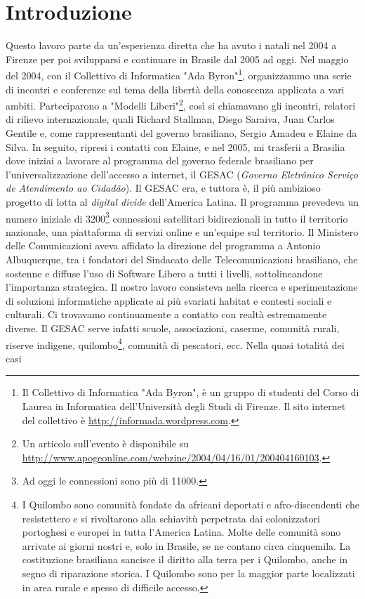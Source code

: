 
\chapter{Introduzione}
\label{Capitolo1}

Questo lavoro parte da un'esperienza diretta che ha avuto i natali nel
2004 a Firenze per poi svilupparsi e continuare in Brasile dal 2005 ad
oggi. Nel maggio del 2004, con il Collettivo di Informatica "Ada
Byron"\footnote{Il Collettivo di Informatica "Ada Byron", è un gruppo
  di studenti del Corso di Laurea in Informatica dell’Università degli
  Studi di Firenze. Il sito internet del collettivo è
  \url{http://informada.wordpress.com}.}, organizzammo una serie di
incontri e conferenze sul tema della libertà della conoscenza
applicata a vari ambiti. Parteciparono a "Modelli Liberi"\footnote{Un
  articolo sull'evento è disponibile su
  \url{http://www.apogeonline.com/webzine/2004/04/16/01/200404160103}.},
così si chiamavano gli incontri, relatori di rilievo internazionale,
quali Richard Stallman, Diego Saraiva, Juan Carlos Gentile e, come
rappresentanti del governo brasiliano, Sergio Amadeu e Elaine da
Silva. In seguito, ripresi i contatti con Elaine, e nel 2005, mi
trasferii a Brasilia dove iniziai a lavorare al programma del governo
federale brasiliano per l'universalizzazione dell'accesso a internet,
il GESAC (\emph{Governo Eletrônico Serviço de Atendimento ao
  Cidadão}). Il GESAC era, e tuttora è, il più ambizioso progetto di
lotta al \emph{digital divide} dell'America Latina. Il programma
prevedeva un numero iniziale di 3200\footnote{Ad oggi le connessioni
  sono più di 11000.} connessioni satellitari bidirezionali in tutto il
territorio nazionale, una piattaforma di servizi online e un'equipe
sul territorio. Il Ministero delle Comunicazioni aveva affidato la
direzione del programma a Antonio Albuquerque, tra i fondatori del
Sindacato delle Telecomunicazioni brasiliano, che sostenne e diffuse
l'uso di Software Libero a tutti i livelli, sottolineandone
l'importanza strategica. Il nostro lavoro consisteva nella ricerca e
sperimentazione di soluzioni informatiche applicate ai più svariati
habitat e contesti sociali e culturali. Ci trovavamo continuamente a
contatto con realtà estremamente diverse. Il GESAC serve infatti
scuole, associazioni, caserme, comunità rurali, riserve indigene,
quilombo\footnote{I Quilombo sono comunità fondate da africani
  deportati e afro-discendenti che resistettero e si rivoltarono alla
  schiavitù perpetrata dai colonizzatori portoghesi e europei in tutta
  l'America Latina. Molte delle comunità sono arrivate ai giorni
  nostri e, solo in Brasile, se ne contano circa cinquemila. La
  costituzione brasiliana sancisce il diritto alla terra per i
  Quilombo, anche in segno di riparazione storica. I Quilombo sono per
  la maggior parte localizzati in area rurale e spesso di difficile
  accesso.}, comunità di pescatori, ecc. Nella quasi totalità dei casi
